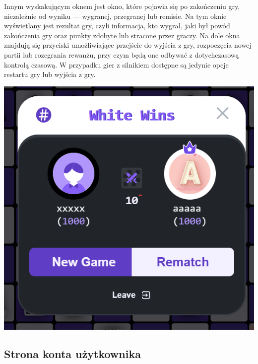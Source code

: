 \documentclass[twoside]{projektInzynierskiMS1}
\begin{document}
\noindent
\begin{minipage}[t]{0.55\textwidth} 
    \vspace{0pt} 
    \justifying 
    \noindent 
    Innym wyskakującym oknem jest okno, które pojawia się po zakończeniu gry, niezależnie od wyniku — wygranej, przegranej lub remisie. Na tym oknie wyświetlany jest rezultat gry, czyli informacja, kto wygrał, jaki był powód zakończenia gry oraz punkty zdobyte lub stracone przez graczy. Na dole okna znajdują się przyciski umożliwiające przejście do wyjścia z gry, rozpoczęcia nowej partii lub rozegrania rewanżu, przy czym będą one odbywać z dotychczasową kontrolą czasową. W przypadku gier z silnikiem dostępne są jedynie opcje restartu gry lub wyjścia z gry.
\end{minipage} 
\hfill 
\begin{minipage}[t]{0.35\textwidth} 
    \vspace{0pt} 
    \centering 
    \includegraphics[width=\linewidth]{images/ins_min_win.png} 
\end{minipage}

\newpage

\subsection{Strona konta użytkownika}
\end{document}
